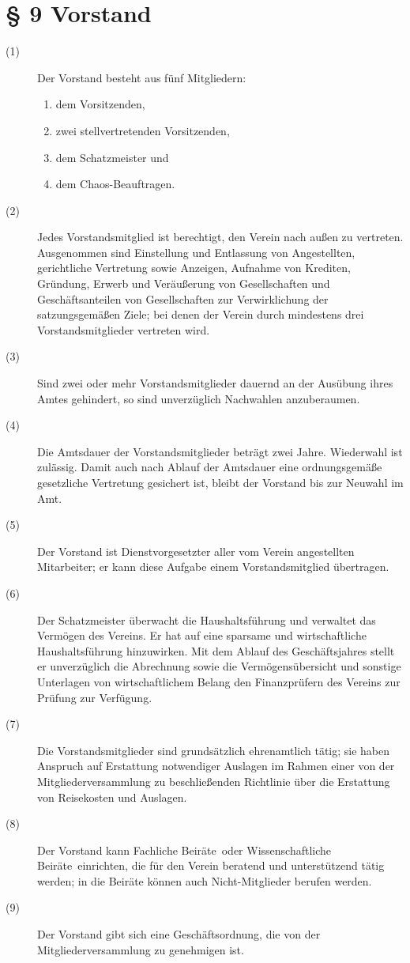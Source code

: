\documentclass[12pt,paper=a4,ngerman]{scrreprt}
\begin{document}
\section{\S{} 9 Vorstand}
\begin{description}
	\item[(1)] Der Vorstand besteht aus fünf Mitgliedern:
	\begin{enumerate}
		\item dem Vorsitzenden,
		\item zwei stellvertretenden Vorsitzenden,
		\item dem Schatzmeister und
		\item dem Chaos-Beauftragen.
	\end{enumerate}
	\item[(2)] Jedes Vorstandsmitglied ist berechtigt, den Verein nach außen zu vertreten. Ausgenommen sind Einstellung und Entlassung von Angestellten, gerichtliche Vertretung sowie Anzeigen, Aufnahme von Krediten, Gründung, Erwerb und Veräußerung von Gesellschaften und Geschäftsanteilen von Gesellschaften zur Verwirklichung der satzungsgemäßen Ziele; bei denen der Verein durch mindestens drei Vorstandsmitglieder vertreten wird.
	\item[(3)] Sind zwei oder mehr Vorstandsmitglieder dauernd an der Ausübung ihres Amtes gehindert, so sind unverzüglich Nachwahlen anzuberaumen.
	\item[(4)] Die Amtsdauer der Vorstandsmitglieder beträgt zwei Jahre. Wiederwahl ist zulässig. Damit auch nach Ablauf der Amtsdauer eine ordnungsgemäße gesetzliche Vertretung gesichert ist, bleibt der Vorstand bis zur Neuwahl im Amt.
	\item[(5)] Der Vorstand ist Dienstvorgesetzter aller vom Verein angestellten Mitarbeiter; er kann diese Aufgabe einem Vorstandsmitglied übertragen.
	\item[(6)] Der Schatzmeister überwacht die Haushaltsführung und verwaltet das Vermögen des Vereins. Er hat auf eine sparsame und wirtschaftliche Haushaltsführung hinzuwirken. Mit dem Ablauf des Geschäftsjahres stellt er unverzüglich die Abrechnung sowie die Vermögensübersicht und sonstige Unterlagen von wirtschaftlichem Belang den Finanzprüfern des Vereins zur Prüfung zur Verfügung.
	\item[(7)] Die Vorstandsmitglieder sind grundsätzlich ehrenamtlich tätig; sie haben Anspruch auf Erstattung notwendiger Auslagen im Rahmen einer von der Mitgliederversammlung zu beschließenden Richtlinie über die Erstattung von Reisekosten und Auslagen.
	\item[(8)] Der Vorstand kann \glqq Fachliche Beiräte\grqq ~oder \glqq Wissenschaftliche Beiräte\grqq ~einrichten, die für den Verein beratend und unterstützend tätig werden; in die Beiräte können auch Nicht-Mitglieder berufen werden.
	\item[(9)] Der Vorstand gibt sich eine Geschäftsordnung, die von der Mitgliederversammlung zu genehmigen ist.
\end{description}
\end{document}
